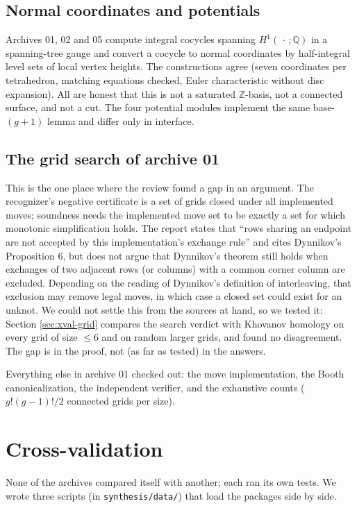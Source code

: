 \documentclass[11pt]{article}
\theoremstyle{remark}
\newcommand{\code}[1]{\texttt{#1}}
\begin{document}
\subsection{Normal coordinates and potentials}
Archives 01, 02 and 05 compute integral cocycles spanning $H^1(\,\cdot\,;\mathbb Q)$
in a spanning-tree gauge and convert a cocycle to normal coordinates by
half-integral level sets of local vertex heights. The constructions agree
(seven coordinates per tetrahedron, matching equations checked, Euler
characteristic without disc expansion). All are honest that this is not a
saturated $\mathbb Z$-basis, not a connected surface, and not a cut. The four
potential modules implement the same base-$(g+1)$ lemma and differ only in
interface.

\subsection{The grid search of archive 01}
\label{sec:grid}
This is the one place where the review found a gap in an argument. The
recognizer's negative certificate is a set of grids closed under all
implemented moves; soundness needs the implemented move set to be exactly a
set for which monotonic simplification holds. The report states that
``rows sharing an endpoint are not accepted by this implementation's
exchange rule'' and cites Dynnikov's Proposition 6, but does not argue that
Dynnikov's theorem still holds when exchanges of two adjacent rows (or
columns) with a common corner column are excluded. Depending on the reading
of Dynnikov's definition of interleaving, that exclusion may remove legal
moves, in which case a closed set could exist for an unknot. We could not
settle this from the sources at hand, so we tested it: Section
\ref{sec:xval-grid} compares the search verdict with Khovanov homology on
every grid of size $\le6$ and on random larger grids, and found no
disagreement. The gap is in the proof, not (as far as tested) in the answers.

Everything else in archive 01 checked out: the move implementation, the
Booth canonicalization, the independent verifier, and the exhaustive counts
($g!(g-1)!/2$ connected grids per size).

\section{Cross-validation}
None of the archives compared itself with another; each ran its own tests.
We wrote three scripts (in \code{synthesis/data/}) that load the packages
side by side.
\end{document}
